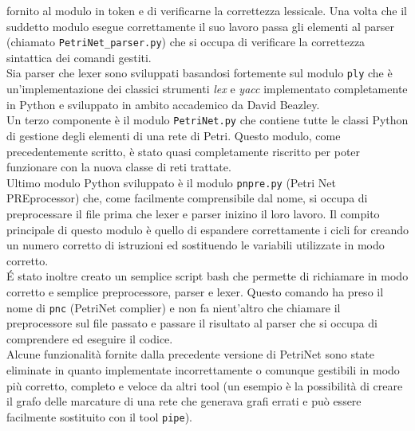 \documentclass[italian,12pt]{book}
\begin{document}
 fornito al modulo in token e di verificarne la correttezza lessicale. Una volta che il suddetto modulo 
 esegue correttamente il suo lavoro passa gli elementi al parser (chiamato {\tt PetriNet\_parser.py}) 
 che si occupa di verificare la correttezza sintattica dei comandi gestiti.\\
 Sia parser che lexer sono sviluppati basandosi fortemente sul modulo {\tt ply}
 che è un'implementazione dei classici strumenti \emph{lex} e \emph{yacc} implementato 
 completamente in Python e sviluppato in ambito accademico da David Beazley. \\
 Un terzo componente è il modulo {\tt PetriNet.py} che contiene tutte le classi Python 
 di gestione degli elementi di una rete di Petri. Questo modulo, come precedentemente scritto, è stato
 quasi completamente riscritto per poter funzionare con la nuova classe di reti trattate. \\
 Ultimo modulo Python sviluppato è il modulo {\tt pnpre.py} (Petri Net PREprocessor) che, come 
 facilmente comprensibile dal nome, si occupa di preprocessare il file prima che lexer e parser
 inizino il loro lavoro. Il compito principale di questo modulo è quello di espandere correttamente 
 i cicli for creando un numero corretto di istruzioni ed sostituendo le variabili utilizzate in modo corretto. \\
 \'E stato inoltre creato un semplice script bash che permette di richiamare in modo corretto e semplice
 preprocessore, parser e lexer. Questo comando ha preso il nome di {\tt pnc} (PetriNet complier) e non 
 fa nient'altro che chiamare il preprocessore sul file passato e passare il risultato al parser che si occupa 
 di comprendere ed eseguire il codice.\\
 Alcune funzionalità fornite dalla precedente versione di PetriNet sono state eliminate in quanto 
 implementate incorrettamente o comunque gestibili in modo più corretto, completo e veloce da 
 altri tool (un esempio è la possibilità di creare il grafo delle marcature di una rete che generava 
 grafi errati e può essere facilmente sostituito con il tool {\tt pipe}). \\
 
\end{document}

